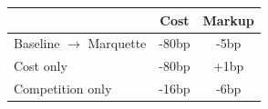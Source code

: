 \begin{tabular}{lcc}
\toprule
 & Cost & Markup \\
\midrule
Baseline $\to$ Marquette & -80bp & -5bp \\
Cost only & -80bp & +1bp \\
Competition only & -16bp & -6bp \\
\bottomrule
\end{tabular}
